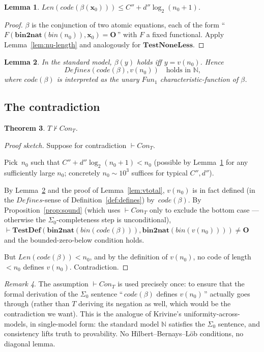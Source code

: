 \documentclass[11pt]{article}
\theoremstyle{plain}
\newtheorem{theorem}{Theorem}[section]
\newtheorem{lemma}[theorem]{Lemma}
\theoremstyle{definition}
\theoremstyle{remark}
\newtheorem{remark}[theorem]{Remark}
\newcommand{\code}[1]{\mathit{code}(#1)}
\newcommand{\Fun}{\mathit{Fun}}
\newcommand{\Defines}{\mathit{Defines}}
\newcommand{\Con}{\mathit{Con}}
\newcommand{\Len}{\mathit{Len}}
\newcommand{\bnt}{\mathbf{bin2nat}}
\newcommand{\bin}{\mathit{bin}}
\begin{document}
\begin{lemma}\label{lem:beta-len}
$\Len(\code{\beta(\mathbf{x}_0)}) \leq C'' + d'' \log_2(n_0 + 1)$.
\end{lemma}

\begin{proof}
$\beta$ is the conjunction of two atomic equations, each of the form
``\,$F(\bnt(\bin(n_0)), \mathbf{x}_0) = \mathbf{O}$\,'' with $F$ a
fixed functional.  Apply Lemma~\ref{lem:nu-length} and analogously for
$\mathbf{TestNoneLess}$.
\end{proof}

\begin{lemma}\label{lem:beta-defines}
In the standard model, $\beta(y)$ holds iff $y = v(n_0)$.  Hence
$$
\Defines(\code{\beta}, v(n_0))
\quad\text{holds in $\mathbb{N}$,}
$$
where $\code{\beta}$ is interpreted as the unary $\Fun_1$
characteristic-function of $\beta$.
\end{lemma}

\subsection{The contradiction}

\begin{theorem}\label{thm:berry}
$T \not\vdash \Con_T$.
\end{theorem}

\begin{proof}[Proof sketch]
Suppose for contradiction $\vdash \Con_T$.

Pick~$n_0$ such that $C'' + d'' \log_2(n_0 + 1) < n_0$ (possible by
Lemma~\ref{lem:beta-len} for any sufficiently large $n_0$; concretely
$n_0 \sim 10^3$ suffices for typical $C'', d''$).

By Lemma~\ref{lem:beta-defines} and the proof of
Lemma~\ref{lem:vtotal}, $v(n_0)$ is in fact defined (in the
$\Defines$-sense of Definition~\ref{def:defines}) by~$\code{\beta}$.
By Proposition~\ref{prop:sound} (which uses $\vdash \Con_T$ only to
exclude the bottom case --- otherwise the $\Sigma_0$-completeness step
is unconditional), $\vdash \mathbf{TestDef}(\bnt(\bin(\code{\beta})),
\bnt(\bin(v(n_0)))) \neq \mathbf{O}$ and the bounded-zero-below
condition holds.

But $\Len(\code{\beta}) < n_0$, and by the definition of $v(n_0)$, no
code of length $< n_0$ defines $v(n_0)$.  Contradiction.
\end{proof}

\begin{remark}\label{rem:role-of-con}
The assumption $\vdash \Con_T$ is used precisely once: to ensure that
the formal derivation of the $\Sigma_0$ sentence ``\,$\code{\beta}$
defines $v(n_0)$\,'' actually goes through (rather than $T$
deriving its negation as well, which would be the contradiction we
want).  This is the analogue of Krivine's uniformity-across-models, in
single-model form: the standard model $\mathbb{N}$ satisfies the
$\Sigma_0$ sentence, and consistency lifts truth to provability.  No
H\"ilbert--Bernays--L\"ob conditions, no diagonal lemma.
\end{remark}
\end{document}
